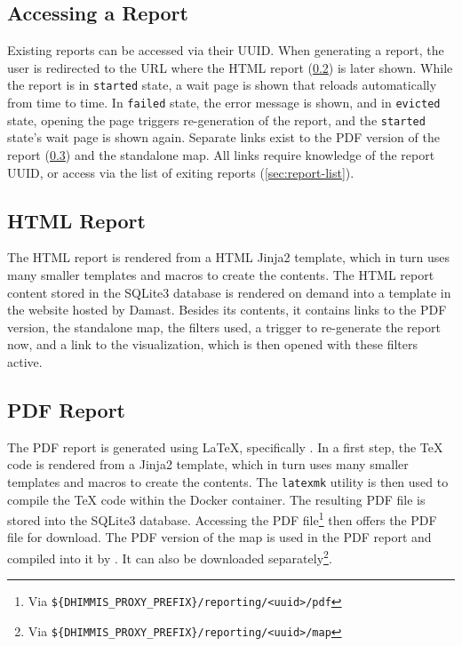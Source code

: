 \subsection{Accessing a Report}
\label{sec:report-access}

Existing reports can be accessed via their UUID.
When generating a report, the user is redirected to the URL where the HTML report (\cref{sec:report-html}) is later shown.
While the report is in \verb!started! state, a wait page is shown that reloads automatically from time to time.
In \verb!failed! state, the error message is shown, and in \verb!evicted! state, opening the page triggers re-generation of the report, and the \verb!started! state's wait page is shown again.
Separate links exist to the PDF version of the report (\cref{sec:report-pdf}) and the standalone map.
All links require knowledge of the report UUID, or access via the list of exiting reports (\cref{sec:report-list}).


\subsection{HTML Report}
\label{sec:report-html}

The HTML report is rendered from a HTML Jinja2 template, which in turn uses many smaller templates and macros to create the contents.
The HTML report content stored in the SQLite3 database is rendered on demand into a template in the website hosted by Damast.
Besides its contents, it contains links to the PDF version, the standalone map, the filters used, a trigger to re-generate the report now, and a link to the visualization, which is then opened with these filters active.


\subsection{PDF Report}
\label{sec:report-pdf}

The PDF report is generated using \LaTeX{}, specifically \XeLaTeX.
In a first step, the \TeX{} code is rendered from a Jinja2 template, which in turn uses many smaller templates and macros to create the contents.
The \verb!latexmk! utility is then used to compile the \TeX{} code within the Docker container.
The resulting PDF file is stored into the SQLite3 database.
Accessing the PDF file\footnote{Via \texttt{\$\{DHIMMIS\_PROXY\_PREFIX\}/reporting/<uuid>/pdf}} then offers the PDF file for download.
The PDF version of the map is used in the PDF report and compiled into it by \XeLaTeX{}.
It can also be downloaded separately\footnote{Via \texttt{\$\{DHIMMIS\_PROXY\_PREFIX\}/reporting/<uuid>/map}}.


